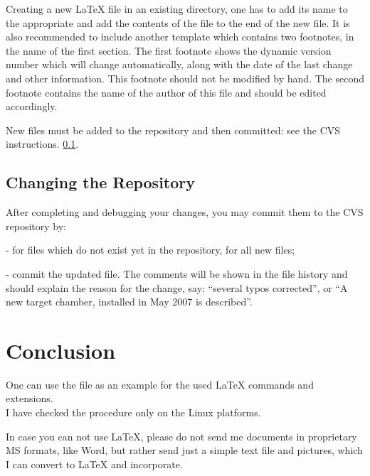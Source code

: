 \documentclass[12pt,letterpaper]{article}
\begin{document}
  Creating a new \LaTeX{} file in an existing directory,
  one has to add its name to the appropriate 
  and add the contents of the file 
  to the end of the new file. 
  It is also recommended to include another template 
  which contains two footnotes, in the name of the first section.
  The first footnote
  shows the dynamic version number which will change automatically, along
   with the date of the last change and other information. This footnote
   should not be modified by hand. The second footnote contains the name
   of the author of this file and should be edited accordingly.

   New files must be added to the repository and then committed:
   see the CVS instructions.
  \ref{sec:commit}.

\subsection{Changing the Repository}
\label{sec:commit}

  After completing and debugging your changes, you may commit them
  to the CVS repository by:\\
  \begin{list}{}{\setlength{\itemsep}{-0.15cm}}
    \item {} - for files which do not exist yet in the repository,
                                        for all new files;
    \item {} - commit the updated file.
          The comments will be shown in the file history and should explain the reason for the
          change, say: ``several typos corrected'', or ``A new target chamber, installed in May 2007 is described''.
  \end{list}

\section{Conclusion}
\label{sec:conclusion}

  One can use the file  as an
  example for the used \LaTeX{} commands and extensions. \\

  I have checked the procedure only on the Linux platforms.

  In case you can not use \LaTeX{},
  please do not send me documents in proprietary MS formats, like Word,
  but rather send just a simple text file and pictures, which I can
  convert to \LaTeX{} and incorporate. 




\end{document}

